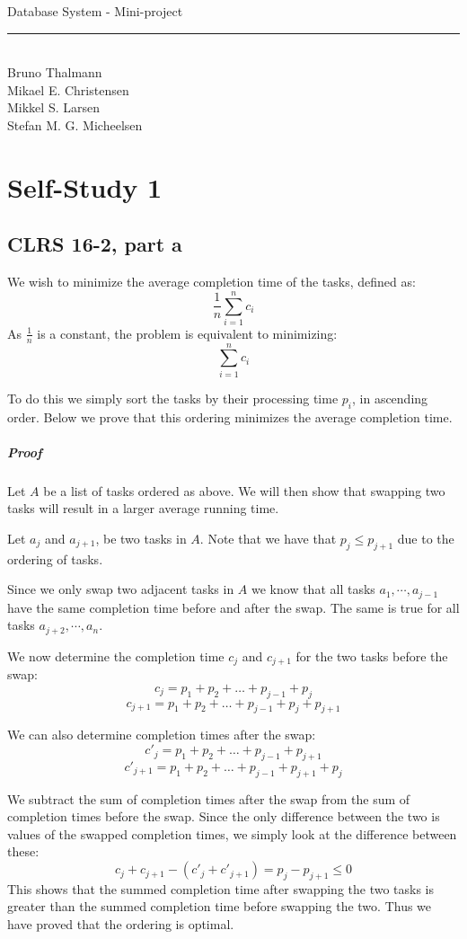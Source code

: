 
\newcommand{\HRule}{\rule{\linewidth}{0.5mm}}


\begin{titlepage}
\centering
{\LARGE Database System - Mini-project}
\HRule \\[0.5cm]
Bruno Thalmann\\
			Mikael E. Christensen\\
			Mikkel S. Larsen\\
			Stefan M. G. Micheelsen
\end{titlepage}

\chapter*{Self-Study 1}

\section*{CLRS 16-2, part a}
We wish to minimize the average completion time of the tasks, defined as:
$$\frac{1}{n}\sum_{i=1}^{n}c_i$$
As $\frac{1}{n}$ is a constant, the problem is equivalent to minimizing:
$$\sum_{i=1}^{n}c_i$$

To do this we simply sort the tasks by their processing time $p_i$, in ascending order.
Below we prove that this ordering minimizes the average completion time.

\paragraph{Proof}
Let $A$ be a list of tasks ordered as above.
We will then show that swapping two tasks will result in a larger average running time.

Let $a_j$ and $a_{j+1}$, be two tasks in $A$.
Note that we have that $p_j \leq p_{j+1}$ due to the ordering of tasks.

Since we only swap two adjacent tasks in $A$ we know that all tasks $a_1, \cdots, a_{j-1}$ have the same completion time before and after the swap.
The same is true for all tasks $a_{j+2},\cdots,a_n$.

We now determine the completion time $c_j$ and $c_{j+1}$ for the two tasks before the swap:
$$c_j=p_1+p_2+\dots+p_{j-1}+p_j$$
$$c_{j+1}=p_1+p_2+\dots+p_{j-1}+p_j + p_{j+1}$$

We can also determine completion times after the swap:
$$c'_j=p_1+p_2+\dots+p_{j-1}+p_{j+1}$$
$$c'_{j+1}=p_1+p_2+\dots+p_{j-1}+p_{j+1} + p_j$$

We subtract the sum of completion times after the swap from the sum of completion times before the swap.
Since the only difference between the two is values of the swapped completion times, we simply look at the difference between these:
$$c_j + c_{j+1} - (c'_j + c'_{j+1})= p_j - p_{j + 1} \leq 0$$
This shows that the summed completion time after swapping the two tasks is greater than the summed completion time before swapping the two.
Thus we have proved that the ordering is optimal.
